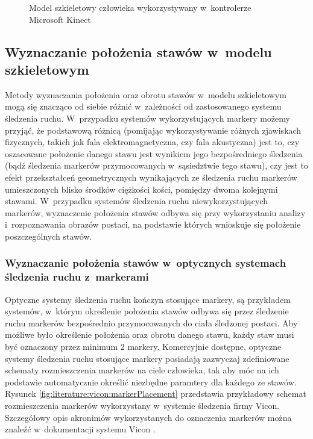 \begin{savenotes}
	\begin{figure}[!htb]	
		\centering
		\scalebox{0.73}{													
			
		}
		\caption{Model szkieletowy człowieka wykorzystywany w~kontrolerze Microsoft Kinect}
		\label{fig:characteristics:kinect:skeleton}
	\end{figure}
\end{savenotes}		
													
\subsection{Wyznaczanie położenia stawów w~modelu szkieletowym}
Metody wyznaczania położenia oraz obrotu stawów w~modelu szkieletowym mogą się znacząco od siebie różnić w~zależności od zastosowanego systemu śledzenia ruchu. W~przypadku systemów wykorzystujących markery możemy przyjąć, że podstawową różnicą (pomijając wykorzystywanie różnych zjawiskach fizycznych, takich jak fala elektromagnetyczna, czy fala akustyczna) jest to, czy oszacowane położenie danego stawu jest wynikiem jego bezpośredniego śledzenia (bądź śledzenia markerów przymocowanych w~sąsiedztwie tego stawu), czy jest to efekt przekształceń geometrycznych wynikających ze śledzenia ruchu markerów umieszczonych blisko środków ciężkości kości, pomiędzy dwoma kolejnymi stawami. W~przypadku systemów śledzenia ruchu niewykorzystujących markerów, wyznaczenie położenia stawów odbywa się przy wykorzystaniu analizy i~rozpoznawania obrazów postaci, na podstawie których wnioskuje się położenie poszczególnych stawów.
																	
\subsubsection*{Wyznaczanie położenia stawów w~optycznych systemach śledzenia ruchu z~markerami}
Optyczne systemy śledzenia ruchu kończyn stosujące markery, są przykładem systemów, w~którym określenie położenia stawów odbywa się przez śledzenie ruchu markerów bezpośrednio przymocowanych do ciała śledzonej postaci. Aby możliwe było określenie położenia oraz obrotu danego stawu, każdy staw musi być oznaczony przez minimum 2 markery. Komercyjnie dostępne, optyczne systemy śledzenia ruchu stosujące markery posiadają zazwyczaj zdefiniowane schematy rozmieszczenia markerów na ciele człowieka, tak aby móc na ich podstawie automatycznie określić niezbędne paramtery dla każdego ze stawów. Rysunek \ref{fig:literature:vicon:markerPlacement} przedstawia przykładowy schemat rozmieszczenia markerów wykorzystany w~systemie śledzenia firmy Vicon. Szczegółowy opis akronimów wykorzystanych do oznaczenia markerów można znaleźć w~dokumentacji systemu Vicon \cite{ViconGaitPlacement}.
																	
